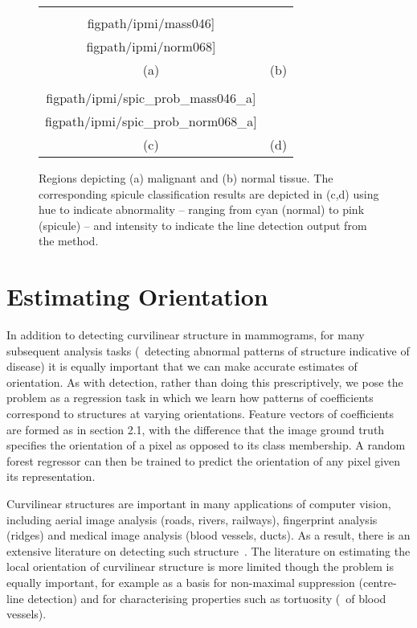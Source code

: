 \begin{figure}
\centering
\begin{tabular}{c c}
\texttt{[image: \\figpath/ipmi/mass046]} &
\texttt{[image: \\figpath/ipmi/norm068]} \\
(a) & (b) \\
\texttt{[image: \\figpath/ipmi/spic\_prob\_mass046\_a]} &
\texttt{[image: \\figpath/ipmi/spic\_prob\_norm068\_a]} \\
(c) & (d)
\end{tabular}
%
\caption{Regions depicting (a) malignant and (b) normal tissue. The corresponding spicule classification results are depicted in (c,d) using hue to indicate abnormality -- ranging from cyan (normal) to pink (spicule) -- and intensity to indicate the line detection output from the \dtcwt{} method.}
\label{f:spicule_classification}
\end{figure}


\section{Estimating Orientation}
In addition to detecting curvilinear structure in mammograms, for many subsequent analysis tasks (\eg~detecting abnormal patterns of structure indicative of disease) it is equally important that we can make accurate estimates of orientation. As with detection, rather than doing this prescriptively, we pose the problem as a regression task in which we learn how patterns of \dtcwt{} coefficients correspond to structures at varying orientations. Feature vectors of \dtcwt{} coefficients are formed as in section 2.1, with the difference that the image ground truth specifies the orientation of a pixel as opposed to its class membership. A random forest regressor can then be trained to predict the orientation of any pixel given its \dtcwt{} representation.

Curvilinear structures are important in many applications of computer vision, including aerial image analysis (roads, rivers, railways), fingerprint analysis (ridges) and medical image analysis (blood vessels, ducts). As a result, there is an extensive literature on detecting such structure~\cite{Papari_Petkov_IVC11}. The literature on estimating the local orientation of curvilinear structure is more limited though the problem is equally important, for example as a basis for non-maximal suppression (centre-line detection) and for characterising properties such as tortuosity (\eg~of blood vessels).

